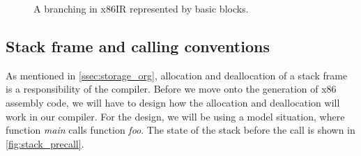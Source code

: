 \documentclass[thesis=M,english]{FITthesis}[2019/12/23]
\begin{document}
\begin{figure}
	\centering
	\hspace{1em}
	\caption{A branching in x86IR represented by basic blocks.}
	\label{fig:x86ir_branching}
\end{figure}

\subsection{Stack frame and calling conventions}\label{ssec:stack_frame}
As mentioned in \autoref{ssec:storage_org}, allocation and deallocation of a stack frame is a responsibility of the compiler. Before we move onto the generation of x86 assembly code, we will have to design how the allocation and deallocation will work in our compiler. For the design, we will be using a model situation, where function \emph{main} calls function \emph{foo}. The state of the stack before the call is shown in \autoref{fig:stack_precall}.
\end{document}
